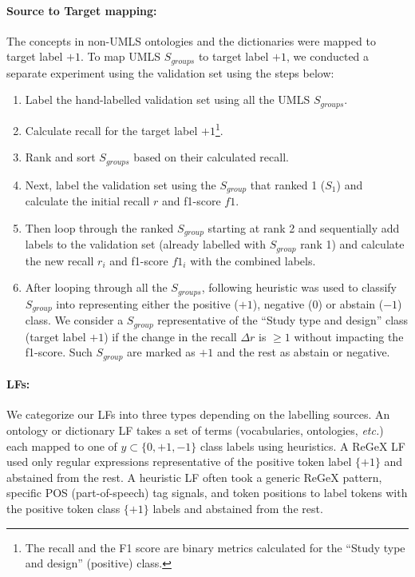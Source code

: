 \documentclass{IOS-Book-Article}
\begin{document}
\paragraph{Source to Target mapping: }
The concepts in non-UMLS ontologies and the dictionaries were mapped to target label $+1$.
To map UMLS $S_{groups}$ to target label $+1$, we conducted a separate experiment using the validation set using the steps below:
%
%
%
\begin{enumerate}
    \item Label the hand-labelled validation set using all the UMLS $S_{groups}$.
    \item Calculate recall for the target label $+1$\footnote{The recall and the F1 score are binary metrics calculated for the ``Study type and design'' (positive) class.}.
    \item Rank and sort $S_{groups}$ based on their calculated recall.
    \item Next, label the validation set using the $S_{group}$ that ranked 1 ($S_{1}$) and calculate the initial recall $r$ and f1-score $f1$.
    \item Then loop through the ranked $S_{group}$ starting at rank 2 and sequentially add labels to the validation set (already labelled with $S_{group}$ rank 1) and calculate the new recall $r_{i}$ and f1-score $f1_{i}$ with the combined labels.
    \item After looping through all the $S_{groups}$, following heuristic was used to classify $S_{group}$ into representing either the positive ($+1$), negative ($0$) or abstain ($-1$) class. 
    We consider a $S_{group}$ representative of the ``Study type and design'' class (target label $+1$) if the change in the recall $\Delta r$ is $\geq1$  without impacting the f1-score. Such $S_{group}$ are marked as $+1$ and the rest as abstain or negative.
\end{enumerate}
%
%
%

%
%
%
\paragraph{LFs:}
%
We categorize our LFs into three types depending on the labelling sources.
An ontology or dictionary LF takes a set of terms (vocabularies, ontologies, \textit{etc.}) each mapped to one of $y \subset \{0, +1, -1\} $ class labels using heuristics.
A ReGeX LF used only regular expressions representative of the positive token label $\{+1\}$ and abstained from the rest.
A heuristic LF often took a generic ReGeX pattern, specific POS (part-of-speech) tag signals, and token positions to label tokens with the positive token class $\{+1\}$ labels and abstained from the rest.
%
%
%
\end{document}
